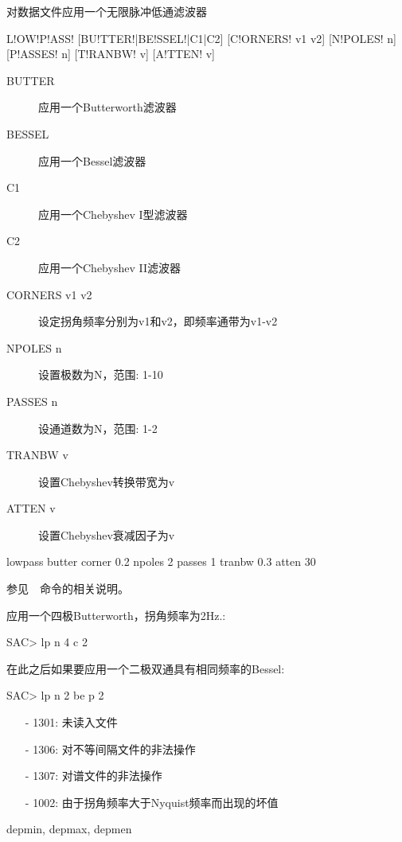 \label{cmd:lowpass}

对数据文件应用一个无限脉冲低通滤波器

\begin{SACSTX}
L!OW!P!ASS! [BU!TTER!|BE!SSEL!|C1|C2] [C!ORNERS! v1 v2] [N!POLES! n] [P!ASSES! n]
    [T!RANBW! v] [A!TTEN! v]
\end{SACSTX}

\begin{description}
\item [BUTTER] 应用一个Butterworth滤波器
\item [BESSEL] 应用一个Bessel滤波器
\item [C1] 应用一个Chebyshev I型滤波器
\item [C2] 应用一个Chebyshev II滤波器
\item [CORNERS v1 v2] 设定拐角频率分别为v1和v2，即频率通带为v1-v2
\item [NPOLES n] 设置极数为N，范围: 1-10
\item [PASSES n] 设通道数为N，范围: 1-2
\item [TRANBW v] 设置Chebyshev转换带宽为v
\item [ATTEN v] 设置Chebyshev衰减因子为v
\end{description}

\begin{SACDFT}
lowpass butter corner 0.2 npoles 2 passes 1 tranbw 0.3 atten 30
\end{SACDFT}

参见~~命令的相关说明。

应用一个四极Butterworth，拐角频率为2Hz.:
\begin{SACCode}
SAC> lp n 4 c 2
\end{SACCode}

在此之后如果要应用一个二极双通具有相同频率的Bessel:
\begin{SACCode}
SAC> lp n 2 be p 2
\end{SACCode}

\begin{itemize}
\item[-]1301: 未读入文件
\item[-]1306: 对不等间隔文件的非法操作
\item[-]1307: 对谱文件的非法操作
\item[-]1002: 由于拐角频率大于Nyquist频率而出现的坏值
\end{itemize}

depmin, depmax, depmen
